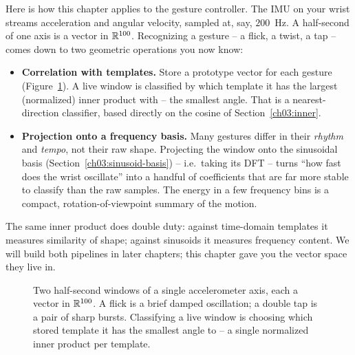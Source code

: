 \begin{goalbox}
Here is how this chapter applies to the gesture controller. The IMU on your wrist streams
acceleration and angular velocity, sampled at, say, $200$~Hz. A half-second of one axis is a vector
in $\mathbb{R}^{100}$. Recognizing a gesture -- a flick, a twist, a tap -- comes down to two geometric
operations you now know:

\begin{itemize}
  \item \textbf{Correlation with templates.} Store a prototype vector for each gesture
    (Figure~\ref{ch03:fig-imu-traces}). A live window is classified by which template it has the
    largest (normalized) inner product with -- the smallest angle. That is a nearest-direction
    classifier, based directly on the cosine of Section~\ref{ch03:inner}.
  \item \textbf{Projection onto a frequency basis.} Many gestures differ in their \emph{rhythm} and
    \emph{tempo}, not their raw shape. Projecting the window onto the sinusoidal basis
    (Section~\ref{ch03:sinusoid-basis}) -- i.e.\ taking its DFT -- turns ``how fast does the wrist
    oscillate'' into a handful of coefficients that are far more stable to classify than the raw
    samples. The energy in a few frequency bins is a compact, rotation-of-viewpoint summary of the
    motion.
\end{itemize}

The same inner product does double duty: against time-domain templates it measures similarity of
shape; against sinusoids it measures frequency content. We will build both pipelines in later
chapters; this chapter gave you the vector space they live in.
\end{goalbox}

\begin{figure}[H]
\centering
{}
\caption{Two half-second windows of a single accelerometer axis, each a vector in $\mathbb{R}^{100}$.
A flick is a brief damped oscillation; a double tap is a pair of sharp bursts. Classifying a live
window is choosing which stored template it has the smallest angle to -- a single normalized inner
product per template.}
\label{ch03:fig-imu-traces}
\end{figure}

